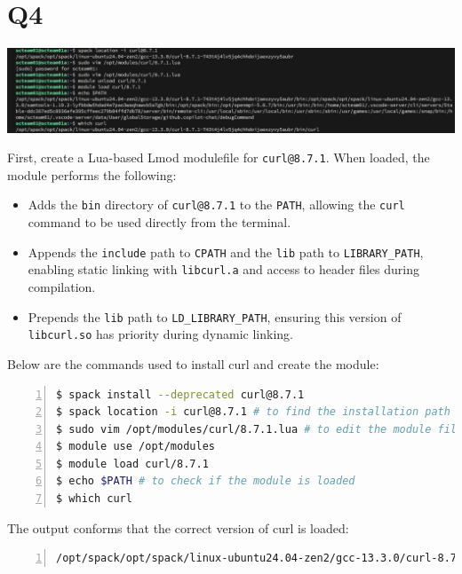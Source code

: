 \documentclass{article}
\begin{document}
\section*{Q4}

\begin{center}
    \includegraphics[width=1\textwidth]{./img/q4-1.png}
\end{center}

First, create a Lua-based Lmod modulefile for \texttt{curl@8.7.1}. When loaded, the module performs the following:

\begin{itemize}
  \item Adds the \texttt{bin} directory of \texttt{curl@8.7.1} to the \texttt{PATH}, allowing the \texttt{curl} command to be used directly from the terminal.
  \item Appends the \texttt{include} path to \texttt{CPATH} and the \texttt{lib} path to \texttt{LIBRARY\_PATH}, enabling static linking with \texttt{libcurl.a} and access to header files during compilation.
  \item Prepends the \texttt{lib} path to \texttt{LD\_LIBRARY\_PATH}, ensuring this version of \texttt{libcurl.so} has priority during dynamic linking.
\end{itemize}

Below are the commands used to install curl and create the module:

\begin{lstlisting}[language=bash, basicstyle=\ttfamily\small, numbers=left, numberstyle=\tiny\color{gray}, stepnumber=1, frame=single, breaklines=true, breakatwhitespace=false]
$ spack install --deprecated curl@8.7.1
$ spack location -i curl@8.7.1 # to find the installation path
$ sudo vim /opt/modules/curl/8.7.1.lua # to edit the module file
$ module use /opt/modules
$ module load curl/8.7.1
$ echo $PATH # to check if the module is loaded
$ which curl 
\end{lstlisting}

The output conforms that the correct version of curl is loaded:

\begin{lstlisting}[language=bash, basicstyle=\ttfamily\small, numbers=left, numberstyle=\tiny\color{gray}, stepnumber=1, frame=single, breaklines=true, breakatwhitespace=false]
/opt/spack/opt/spack/linux-ubuntu24.04-zen2/gcc-13.3.0/curl-8.7.1-743t4j4lv5jq4chhdoijaexzyvy5aubr/bin/curl
\end{lstlisting}
\end{document}
